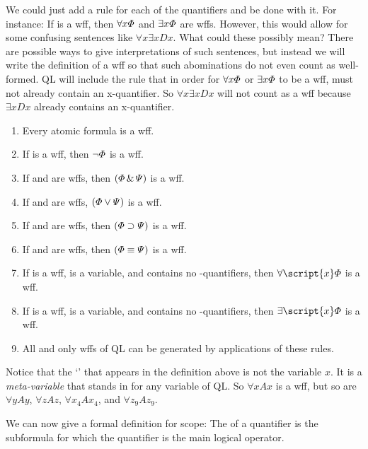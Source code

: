 We could just add a rule for each of the quantifiers and be done with it. For instance: If \metaA{} is a wff, then $\forall x\varPhi{}$ and $\exists x\varPhi{}$ are wffs. However, this would allow for some confusing sentences like $\forall x\exists x Dx$. What could these possibly mean? There are possible ways to give interpretations of such sentences, but instead we will write the definition of a wff so that such abominations do not even count as well-formed. QL will include the rule that in order for $\forall x\varPhi{}$ or $\exists x\varPhi{}$ to be a wff, \metaA{} must not already contain an x-quantifier. So $\forall x \exists x Dx$ will not count as a wff because $\exists x Dx$ already contains an x-quantifier.

\begin{enumerate}
\item Every atomic formula is a wff.
\item If \metaA{} is a wff, then $\neg\varPhi{}$ is a wff.
\item If \metaA{} and \metaB{} are wffs, then $(\varPhi{}\,\&\,\varPsi{})$ is a wff.
\item If \metaA{} and \metaB{} are wffs, $(\varPhi{}\vee\varPsi{})$ is a wff.
\item If \metaA{} and \metaB{} are wffs, then $(\varPhi{}\supset\varPsi{})$ is a wff.
\item If \metaA{} and \metaB{} are wffs, then $(\varPhi{}\equiv\varPsi{})$ is a wff.
\item If \metaA{} is a wff,  is a variable, and \metaA{} contains no -quantifiers, then $\forall\script{x}\metaA{}$ is a wff.
\item If \metaA{} is a wff,  is a variable, and \metaA{} contains no -quantifiers, then $\exists\script{x}\metaA{}$ is a wff.
\item All and only wffs of QL can be generated by applications of these rules.
\end {enumerate}

Notice that the `' that appears in the definition above is not the variable $x$. It is a \emph{meta-variable} that stands in for any variable of QL. So $\forall xAx$ is a wff, but so are $\forall yAy$, $\forall zAz$, $\forall x_4Ax_4$, and $\forall z_9Az_9$.

We can now give a formal definition for scope: The  of a quantifier is the subformula for which the quantifier is the main logical operator. 


